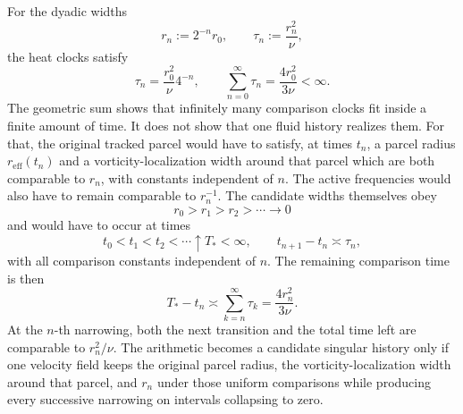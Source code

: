 
For the dyadic widths
\[
  r_n:=2^{-n}r_0,
  \qquad
  \tau_n:=\frac{r_n^2}{\nu},
\]
the heat clocks satisfy
\[
  \tau_n
  =
  \frac{r_0^2}{\nu}4^{-n},
  \qquad
  \sum_{n=0}^{\infty}\tau_n
  =
  \frac{4r_0^2}{3\nu}
  <
  \infty.
\]
The geometric sum shows that infinitely many comparison clocks fit inside a finite amount of time. It does not show that one fluid history realizes them. For that, the original tracked parcel would have to satisfy, at times \(t_n\), a parcel radius \(r_{\mathrm{eff}}(t_n)\) and a vorticity-localization width around that parcel which are both comparable to \(r_n\), with constants independent of \(n\). The active frequencies would also have to remain comparable to \(r_n^{-1}\). The candidate widths themselves obey
\[
  r_0>r_1>r_2>\cdots\longrightarrow0
\]
and would have to occur at times
\[
  t_0<t_1<t_2<\cdots\uparrow T_*<\infty,
  \qquad
  t_{n+1}-t_n\asymp\tau_n,
\]
with all comparison constants independent of \(n\). The remaining comparison time is then
\[
  T_*-t_n
  \asymp
  \sum_{k=n}^{\infty}\tau_k
  =
  \frac{4r_n^2}{3\nu}.
\]
At the \(n\)-th narrowing, both the next transition and the total time left are comparable to \(r_n^2/\nu\). The arithmetic becomes a candidate singular history only if one \NavierStokes{} velocity field keeps the original parcel radius, the vorticity-localization width around that parcel, and \(r_n\) under those uniform comparisons while producing every successive narrowing on intervals collapsing to zero.
